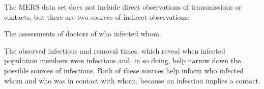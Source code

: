 The MERS data set does not include direct observations of transmissions or contacts,
but there are two sources of indirect observations:
\bi
\item The assessments of doctors of who infected whom.
\item The observed infectious and removal times,
which reveal when infected population members were infectious and,
in so doing, 
help narrow down the possible sources of infections.
\ei
Both of these sources help inform who infected whom and who was in contact with whom,
because an infection implies a contact.
